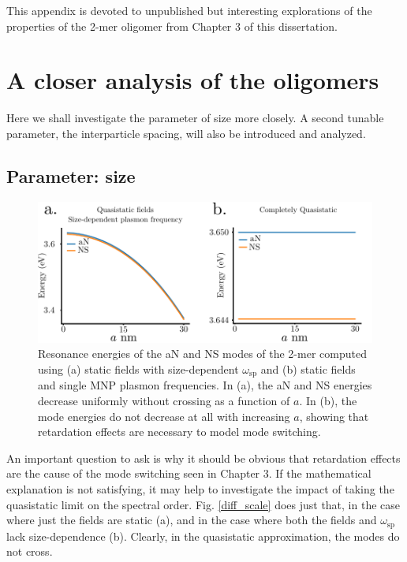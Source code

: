 \documentclass [11pt, proquest] {uwthesis}[2016/11/22]
\begin{document}
This appendix is devoted to unpublished but interesting explorations of the properties of the 2-mer oligomer from Chapter 3 of this dissertation.

\section{A closer analysis of the oligomers}

Here we shall investigate the parameter of size more closely. A second tunable parameter, the interparticle spacing, will also be introduced and analyzed.

\subsection{Parameter: size}

\begin{figure}
\begin{centering}
\includegraphics{qs_limit.pdf}
\caption{Resonance energies of the aN and NS modes of the 2-mer computed using (a) static fields with size-dependent $\omega_{\textrm{sp}}$ and (b) static fields and single MNP plasmon frequencies. In (a), the aN and NS energies decrease uniformly without crossing as a function of $a$. In (b), the mode energies do not decrease at all with increasing $a$, showing that retardation effects are necessary to model mode switching.}
\label{qs_limit}
\end{centering}
\end{figure}

An important question to ask is why it should be obvious that retardation effects are the cause of the mode switching seen in Chapter 3. If the mathematical explanation is not satisfying, it may help to investigate the impact of taking the quasistatic limit on the spectral order. Fig. \ref{diff_scale} does just that, in the case where just the fields are static (a), and in the case where both the fields and $\omega_{\textrm{sp}}$ lack size-dependence (b). Clearly, in the quasistatic approximation, the modes do not cross.
\end{document}
